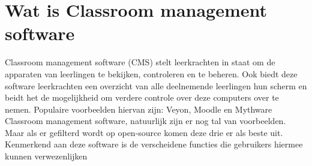 \section{Wat is Classroom management software}
\label{classroom management software}
Classroom management software (CMS) stelt leerkrachten in staat om de apparaten van leerlingen te bekijken, controleren en te beheren. Ook biedt deze software leerkrachten een overzicht van alle deelnemende leerlingen hun scherm en beidt het de mogelijkheid om verdere controle over deze computers over te nemen. \autocite{brioso2017classroom}
Populaire voorbeelden hiervan zijn: Veyon, Moodle en Mythware Classroom management software, natuurlijk zijn er nog tal van voorbeelden. Maar als er gefilterd wordt op open-source komen deze drie er als beste uit.  
Kenmerkend aan deze software is de verscheidene functies die gebruikers hiermee kunnen verwezenlijken
